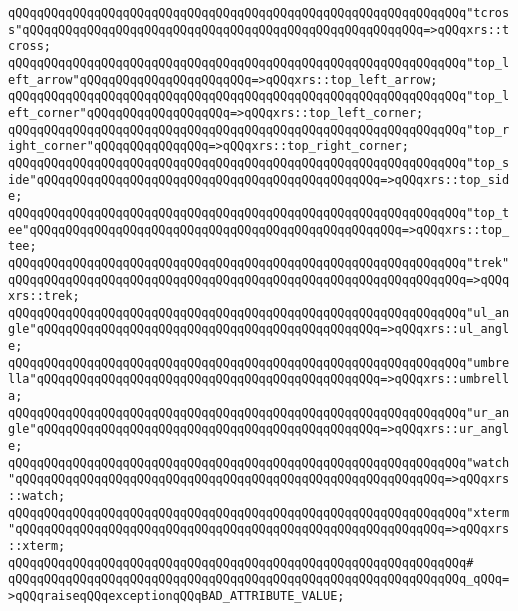 \verb|qQQqqQQqqQQqqQQqqQQqqQQqqQQqqQQqqQQqqQQqqQQqqQQqqQQqqQQqqQQqqQQq"tcross"qQQqqQQqqQQqqQQqqQQqqQQqqQQqqQQqqQQqqQQqqQQqqQQqqQQqqQQq=>qQQqxrs::tcross;|\newline
\verb|qQQqqQQqqQQqqQQqqQQqqQQqqQQqqQQqqQQqqQQqqQQqqQQqqQQqqQQqqQQqqQQq"top_left_arrow"qQQqqQQqqQQqqQQqqQQqqQQq=>qQQqxrs::top_left_arrow;|\newline
\verb|qQQqqQQqqQQqqQQqqQQqqQQqqQQqqQQqqQQqqQQqqQQqqQQqqQQqqQQqqQQqqQQq"top_left_corner"qQQqqQQqqQQqqQQqqQQq=>qQQqxrs::top_left_corner;|\newline
\verb|qQQqqQQqqQQqqQQqqQQqqQQqqQQqqQQqqQQqqQQqqQQqqQQqqQQqqQQqqQQqqQQq"top_right_corner"qQQqqQQqqQQqqQQq=>qQQqxrs::top_right_corner;|\newline
\verb|qQQqqQQqqQQqqQQqqQQqqQQqqQQqqQQqqQQqqQQqqQQqqQQqqQQqqQQqqQQqqQQq"top_side"qQQqqQQqqQQqqQQqqQQqqQQqqQQqqQQqqQQqqQQqqQQqqQQq=>qQQqxrs::top_side;|\newline
\verb|qQQqqQQqqQQqqQQqqQQqqQQqqQQqqQQqqQQqqQQqqQQqqQQqqQQqqQQqqQQqqQQq"top_tee"qQQqqQQqqQQqqQQqqQQqqQQqqQQqqQQqqQQqqQQqqQQqqQQqqQQq=>qQQqxrs::top_tee;|\newline
\verb|qQQqqQQqqQQqqQQqqQQqqQQqqQQqqQQqqQQqqQQqqQQqqQQqqQQqqQQqqQQqqQQq"trek"qQQqqQQqqQQqqQQqqQQqqQQqqQQqqQQqqQQqqQQqqQQqqQQqqQQqqQQqqQQqqQQq=>qQQqxrs::trek;|\newline
\verb|qQQqqQQqqQQqqQQqqQQqqQQqqQQqqQQqqQQqqQQqqQQqqQQqqQQqqQQqqQQqqQQq"ul_angle"qQQqqQQqqQQqqQQqqQQqqQQqqQQqqQQqqQQqqQQqqQQqqQQq=>qQQqxrs::ul_angle;|\newline
\verb|qQQqqQQqqQQqqQQqqQQqqQQqqQQqqQQqqQQqqQQqqQQqqQQqqQQqqQQqqQQqqQQq"umbrella"qQQqqQQqqQQqqQQqqQQqqQQqqQQqqQQqqQQqqQQqqQQqqQQq=>qQQqxrs::umbrella;|\newline
\verb|qQQqqQQqqQQqqQQqqQQqqQQqqQQqqQQqqQQqqQQqqQQqqQQqqQQqqQQqqQQqqQQq"ur_angle"qQQqqQQqqQQqqQQqqQQqqQQqqQQqqQQqqQQqqQQqqQQqqQQq=>qQQqxrs::ur_angle;|\newline
\verb|qQQqqQQqqQQqqQQqqQQqqQQqqQQqqQQqqQQqqQQqqQQqqQQqqQQqqQQqqQQqqQQq"watch"qQQqqQQqqQQqqQQqqQQqqQQqqQQqqQQqqQQqqQQqqQQqqQQqqQQqqQQqqQQq=>qQQqxrs::watch;|\newline
\verb|qQQqqQQqqQQqqQQqqQQqqQQqqQQqqQQqqQQqqQQqqQQqqQQqqQQqqQQqqQQqqQQq"xterm"qQQqqQQqqQQqqQQqqQQqqQQqqQQqqQQqqQQqqQQqqQQqqQQqqQQqqQQqqQQq=>qQQqxrs::xterm;|\newline
\verb|qQQqqQQqqQQqqQQqqQQqqQQqqQQqqQQqqQQqqQQqqQQqqQQqqQQqqQQqqQQqqQQq#|\newline
\verb|qQQqqQQqqQQqqQQqqQQqqQQqqQQqqQQqqQQqqQQqqQQqqQQqqQQqqQQqqQQqqQQq_qQQq=>qQQqraiseqQQqexceptionqQQqBAD_ATTRIBUTE_VALUE;|\newline

